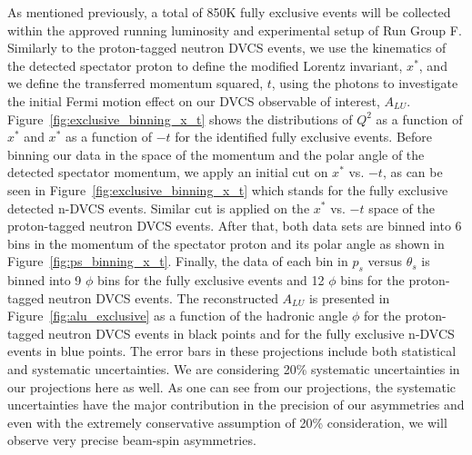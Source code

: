As mentioned previously, a total of 850K fully exclusive events will be 
collected within the approved running luminosity and experimental setup of Run 
Group F. Similarly to the proton-tagged neutron DVCS events, we use the 
kinematics of the detected spectator proton to define the modified Lorentz 
invariant, $x^*$, and we define the transferred momentum squared, $t$, using 
the photons to investigate the initial Fermi motion effect on our DVCS 
observable of interest, $A_{LU}$. Figure~\ref{fig:exclusive_binning_x_t} shows 
the distributions of  $Q^2$ as a function of  $x^*$ and  $x^{*}$ as a function 
of $-t$ for the identified fully exclusive events. Before binning our data in 
the space of the momentum and the polar angle of the detected spectator 
momentum, we apply an initial cut on $x^{*}$ vs. $-t$, as can be seen in 
Figure~\ref{fig:exclusive_binning_x_t} which stands for the fully exclusive 
detected n-DVCS events. Similar cut is applied on the $x^{*}$ vs. $-t$ space of 
the proton-tagged neutron DVCS events. After that, both data sets are binned 
into 6 bins in the momentum of the spectator proton and its polar angle as 
shown in Figure~\ref{fig:ps_binning_x_t}. Finally, the data of each bin in 
$p_s$ versus $\theta_s$ is binned into 9 $\phi$ bins for the fully exclusive 
events and 12 $\phi$ bins for the proton-tagged neutron DVCS events. The 
reconstructed $A_{LU}$ is presented in Figure~\ref{fig:alu_exclusive} as a 
function of the hadronic angle $\phi$ for the proton-tagged neutron DVCS events 
in black points and for the fully exclusive n-DVCS events in blue points. The 
error bars in these projections include both statistical and systematic 
uncertainties. We are considering 20\% systematic uncertainties in our 
projections here as well. As one can see from our projections, the systematic 
uncertainties have the major contribution in the precision of our asymmetries 
and even with the extremely conservative assumption of 20\% consideration, we 
will observe very precise beam-spin asymmetries.        

